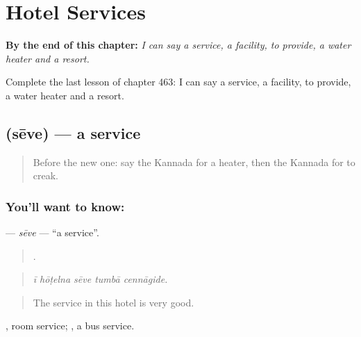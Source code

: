 
\chapter{Hotel Services}
\label{ch:ka-hotel-services}

\begin{chapteropening}
\textbf{By the end of this chapter:} \emph{I can say a service, a facility, to provide, a water heater and a resort.}

Complete the last lesson of chapter 463: I can say a service, a facility, to provide, a water heater and a resort.
\end{chapteropening}

\section[\texorpdfstring{\kn{ಸೇವೆ} (sēve)}{ಸೇವೆ (sēve)}]{ (sēve) — a service}

\label{lesson:KA-C463-seve}



\begin{quote}
Before the new one: say the Kannada for a heater, then the Kannada for to creak.
\end{quote}

\subsection*{You'll want to know: }
\textbf{} — \emph{sēve} — \textquotedblleft{}a service\textquotedblright{}.

\begin{quote}
    .
\end{quote}

\begin{quote}
\emph{ī hōṭelna sēve tumbā cennāgide.}
\end{quote}

\begin{quote}
The service in this hotel is very good.
\end{quote}

 , room service;  , a bus service.

